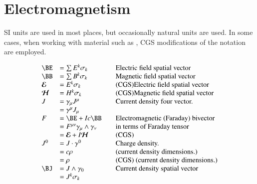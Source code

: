 \section{Electromagnetism}

SI units are
used in most places, but occasionally natural units are used.  In
some cases, when working with material such as \citep{bohm1989qt},
CGS modifications of the notation are employed.

\begin{equation*}
\begin{array}{l l l}
\BE &= \sum E^k \sigma_k & \quad \mbox{Electric field spatial vector} \\
\BB &= \sum B^k \sigma_k & \quad \mbox{Magnetic field spatial vector} \\
\EE &= E^k \sigma_k & \quad \mbox{(CGS)Electric field spatial vector} \\
\HH &= H^k \sigma_k & \quad \mbox{(CGS)Magnetic field spatial vector} \\
J &= \gamma_{\mu} J^{\mu} & \quad \mbox{Current density four vector.} \\
  &= \gamma^{\mu} J_{\mu} \\
F &= \BE + I c \BB & \quad \mbox{Electromagnetic (Faraday) bivector} \\
  &= F^{\mu\nu} \gamma_\mu \wedge \gamma_\nu & \quad \mbox{in terms of Faraday tensor} \\
  &= \EE + I \HH & \quad \mbox{(CGS)} \\
J^{0} &= J \cdot \gamma^0 & \quad \mbox{Charge density.} \\
      &= c \rho & \quad \mbox{(current density dimensions.)} \\
      &= \rho & \quad \mbox{(CGS) (current density dimensions.)} \\
\BJ &= J \wedge \gamma_0 & \quad \mbox{Current density spatial vector} \\
    &= J^k \sigma_k \\
\end{array}
\end{equation*}

